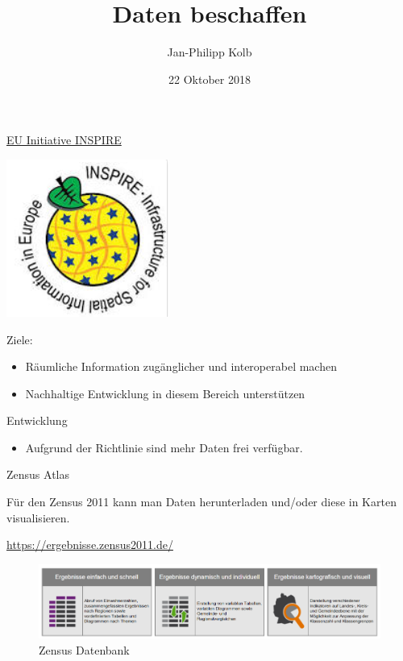 \documentclass[ignorenonframetext,]{beamer}
\title{Daten beschaffen}
\author{Jan-Philipp Kolb}
\date{22 Oktober 2018}
\providecommand{\tightlist}{%
  \setlength{\itemsep}{0pt}\setlength{\parskip}{0pt}}
\begin{document}
\frame{\titlepage}

\begin{frame}{\href{http://inspire.ec.europa.eu/reports/Registration_form.pdf}{EU
Initiative INSPIRE}}
\protect\hypertarget{eu-initiative-inspire}{}

\includegraphics{figure/inspire.PNG}

\begin{block}{Ziele:}

\begin{itemize}
\tightlist
\item
  Räumliche Information zugänglicher und interoperabel machen
\item
  Nachhaltige Entwicklung in diesem Bereich unterstützen
\end{itemize}

\end{block}

\begin{block}{Entwicklung}

\begin{itemize}
\tightlist
\item
  Aufgrund der Richtlinie sind mehr Daten frei verfügbar.
\end{itemize}

\end{block}

\end{frame}

\begin{frame}{Zensus Atlas}
\protect\hypertarget{zensus-atlas}{}

Für den Zensus 2011 kann man Daten herunterladen und/oder diese in
Karten visualisieren.

\begin{block}{\url{https://ergebnisse.zensus2011.de/}}

\begin{figure}
\centering
\includegraphics{figure/Zensusdtb.PNG}
\caption{Zensus Datenbank}
\end{figure}

\end{block}

\end{frame}
\end{document}
